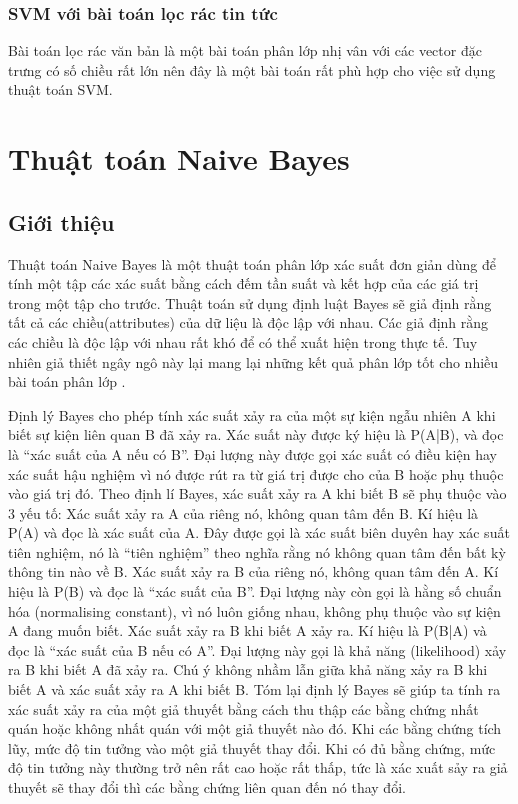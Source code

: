 \subsubsection{SVM với bài toán lọc rác tin tức}
Bài toán lọc rác văn bản là một bài toán phân lớp nhị vân với các vector đặc trưng có số chiều rất lớn nên đây là một bài toán rất phù hợp cho việc sử dụng thuật toán SVM. 
\section{Thuật toán Naive Bayes} 
\subsection{Giới thiệu}
Thuật toán Naive Bayes là một thuật toán phân lớp xác suất đơn giản dùng để tính một tập các xác suất bằng cách đếm tần suất và kết hợp của các giá trị trong một tập cho trước. Thuật toán sử dụng định luật Bayes sẽ giả định rằng tất cả các chiều(attributes) của dữ liệu là độc lập với nhau. Các giả định rằng các chiều là độc lập với nhau rất khó để có thể xuất hiện trong thực tế. Tuy nhiên giả thiết ngây ngô này lại mang lại những kết quả phân lớp tốt cho nhiều bài toán phân lớp \cite{dimitoglou2012comparison}.

Định lý Bayes cho phép tính xác suất xảy ra của một sự kiện ngẫu nhiên A khi biết sự kiện liên quan B đã xảy ra. Xác suất này được ký hiệu là P(A|B), và đọc là “xác suất của A nếu có B”. Đại lượng này được gọi xác suất có điều kiện hay xác suất hậu nghiệm vì nó được rút ra từ giá trị được cho của B hoặc phụ thuộc vào giá trị đó. Theo định lí Bayes, xác suất xảy ra A khi biết B sẽ phụ thuộc vào 3 yếu tố: Xác suất xảy ra A của riêng nó, không quan tâm đến B. Kí hiệu là P(A) và đọc là xác suất của A. Đây được gọi là xác suất biên duyên hay xác suất tiên nghiệm, nó là “tiên nghiệm” theo nghĩa rằng nó không quan tâm đến bất kỳ thông tin nào về B. Xác suất xảy ra B của riêng nó, không quan tâm đến A. Kí hiệu là P(B) và đọc là “xác suất của B”. Đại lượng này còn gọi là hằng số chuẩn hóa (normalising constant), vì nó luôn giống nhau, không phụ thuộc vào sự kiện A đang muốn biết. Xác suất xảy ra B khi biết A xảy ra. Kí hiệu là P(B|A) và đọc là “xác suất của B nếu có A”. Đại lượng này gọi là khả năng (likelihood) xảy ra B khi biết A đã xảy ra. Chú ý không nhầm lẫn giữa khả năng xảy ra B khi biết A và xác suất xảy ra A khi biết B. Tóm lại định lý Bayes sẽ giúp ta tính ra xác suất xảy ra của một giả thuyết bằng cách thu thập các bằng chứng nhất quán hoặc không nhất quán với một giả thuyết nào đó. Khi các bằng chứng tích lũy, mức độ tin tưởng vào một giả thuyết thay đổi. Khi có đủ bằng chứng, mức độ tin tưởng này thường trở nên rất cao hoặc rất thấp, tức là xác xuất sảy ra giả thuyết sẽ thay đổi thì các bằng chứng liên quan đến nó thay đổi.	
